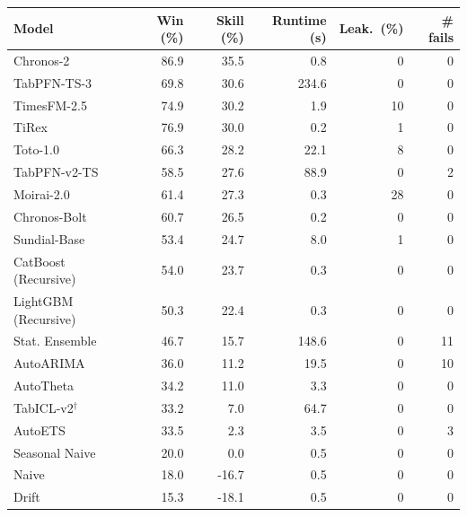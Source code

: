\begin{tabular}{lrrrrr}
\toprule
\textbf{Model} & \textbf{Win (\%)} & \textbf{Skill (\%)} & \textbf{Runtime (s)} & \textbf{Leak.\ (\%)} & \textbf{\# fails} \\
\midrule
Chronos-2            & 86.9 &  35.5 &   0.8 &  0 &  0 \\
\textcolor{PriorMauve}{TabPFN-TS-3}          & 69.8 &  30.6 & 234.6 &  0 &  0 \\
TimesFM-2.5          & 74.9 &  30.2 &   1.9 & 10 &  0 \\
TiRex                & 76.9 &  30.0 &   0.2 &  1 &  0 \\
Toto-1.0             & 66.3 &  28.2 &  22.1 &  8 &  0 \\
\textcolor{PriorMauve}{TabPFN-v2-TS}         & 58.5 &  27.6 &  88.9 &  0 &  2 \\
Moirai-2.0           & 61.4 &  27.3 &   0.3 & 28 &  0 \\
Chronos-Bolt         & 60.7 &  26.5 &   0.2 &  0 &  0 \\
Sundial-Base         & 53.4 &  24.7 &   8.0 &  1 &  0 \\
CatBoost (Recursive) & 54.0 &  23.7 &   0.3 &  0 &  0 \\
LightGBM (Recursive) & 50.3 &  22.4 &   0.3 &  0 &  0 \\
Stat. Ensemble       & 46.7 &  15.7 & 148.6 &  0 & 11 \\
AutoARIMA            & 36.0 &  11.2 &  19.5 &  0 & 10 \\
AutoTheta            & 34.2 &  11.0 &   3.3 &  0 &  0 \\
TabICL-v2$^{\dagger}$ & 33.2 &   7.0 &  64.7 &  0 &  0 \\
AutoETS              & 33.5 &   2.3 &   3.5 &  0 &  3 \\
Seasonal Naive       & 20.0 &   0.0 &   0.5 &  0 &  0 \\
Naive                & 18.0 & -16.7 &   0.5 &  0 &  0 \\
Drift                & 15.3 & -18.1 &   0.5 &  0 &  0 \\
\bottomrule
\end{tabular}
